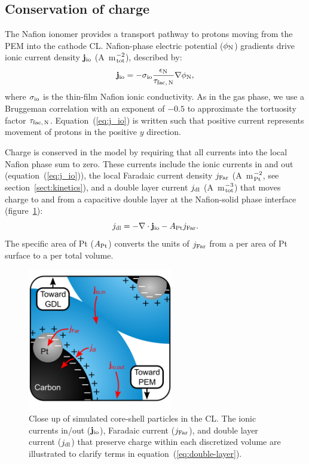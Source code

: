 \documentclass[final,3p,times,twocolumn]{elsarticle}    %
\begin{document}
\subsection{Conservation of charge}

The Nafion ionomer provides a transport pathway to protons moving from the PEM into the cathode CL. Nafion-phase electric potential ($\phi_{\rm N}$) gradients drive ionic current density ${\bf j}_{\rm io}$ (A~m$^{-2}_{\rm tot}$), described by:
\begin{equation} \label{eq:j_io}
    {\bf j}_{\rm io} = - \sigma_{\rm io} \frac{\epsilon_{\rm N}}{\tau_{\rm fac,\,N}} \nabla \phi_{\rm N},
\end{equation}
where $\sigma_{\rm io}$ is the thin-film Nafion ionic conductivity. As in the gas phase, we use a Bruggeman correlation with an exponent of $-0.5$ to approximate the tortuosity factor $\tau_{\rm fac,\,N}$. Equation~(\ref{eq:j_io}) is written such that positive current represents movement of protons in the positive $y$ direction.

Charge is conserved in the model by requiring that all currents into the local Nafion phase sum to zero. These currents include the ionic currents in and out (equation~(\ref{eq:j_io})), the local Faradaic current density $j_{\rm Far}$ (A~m$^{-2}_{\rm Pt}$, see section~\ref{sect:kinetics}), and a double layer current $j_{\rm dl}$ (A~m$^{-3}_{\rm tot}$) that moves charge to and from a capacitive double layer at the Nafion-solid phase interface (figure~\ref{fig:double-layer}):
\begin{equation} \label{eq:double-layer}
    j_{\rm dl} = - \nabla \cdot {\bf j}_{\rm io} - A_{\rm Pt} j_{\rm Far}.
\end{equation}
The specific area of Pt ($A_{\rm Pt}$) converts the units of $j_{\rm Far}$ from a per area of Pt surface to a per total volume. 

\begin{figure}[!t]
    \centering
    \includegraphics[width=2.487in]{figures/double-layer-2_487in.png}
    \caption{Close up of simulated core-shell particles in the CL. The ionic currents in/out (${\bf j}_{\rm io}$), Faradaic current ($j_{\rm Far}$), and double layer current ($j_{\rm dl}$) that preserve charge within each discretized volume are illustrated to clarify terms in equation~(\ref{eq:double-layer}).}
    \label{fig:double-layer}
\end{figure}
\end{document}
